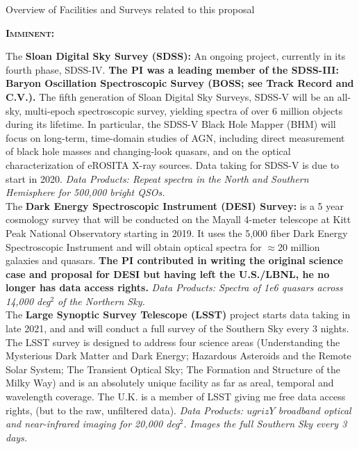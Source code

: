 
\begin{framed}
 \begin{tcolorbox}
   \begin{center} 
     Overview of Facilities and Surveys related to this proposal
   \end{center}
 \end{tcolorbox}
  
\noindent
\textbf{\textsc{Imminent:}}

The {\bf Sloan Digital Sky Survey (SDSS):} An ongoing project,
currently in its fourth phase, SDSS-IV.  {\bf The PI was a leading
member of the SDSS-III: Baryon Oscillation Spectroscopic Survey (BOSS;
see Track Record and C.V.).} The fifth generation of Sloan Digital Sky
Surveys, SDSS-V will be an all-sky, multi-epoch spectroscopic survey,
yielding spectra of over 6 million objects during its lifetime. In
particular, the SDSS-V Black Hole Mapper (BHM) will focus on
long-term, time-domain studies of AGN, including direct measurement of
black hole masses and changing-look quasars, and on the optical
characterization of eROSITA X-ray sources. Data taking for SDSS-V is due to start
in 2020.  {\it Data Products: Repeat spectra
in the North and Southern Hemisphere for 500,000 bright QSOs.} \\

The {\bf Dark Energy Spectroscopic Instrument (DESI) Survey:} is a 5
year cosmology survey that will be conducted on the Mayall 4-meter
telescope at Kitt Peak National Observatory starting in 2019. It uses
the 5,000 fiber Dark Energy Spectroscopic Instrument and will obtain
optical spectra for $\approx$20 million galaxies and quasars.  {\bf
The PI contributed in writing the original science case and proposal
for DESI \citep{Schlegel2011} but having left the U.S./LBNL, he no
longer has data access rights.}  {\it Data Products: Spectra of 1e6
quasars across 14,000 deg$^{2}$ of the Northern Sky.} \\

The {\bf Large Synoptic Survey Telescope (LSST)} project starts data
taking in late 2021, and and will conduct a full survey of the
Southern Sky every 3 nights. The LSST survey is designed to address
four science areas (Understanding the Mysterious Dark Matter and Dark
Energy; Hazardous Asteroids and the Remote Solar System; The Transient
Optical Sky; The Formation and Structure of the Milky Way) and is an
absolutely unique facility as far as areal, temporal and wavelength
coverage. The U.K.  is a member of LSST giving me free data access
rights, (but to the raw, unfiltered data).  {\it Data Products:
$ugrizY$ broadband optical and near-infrared imaging for 20,000
deg$^2$.  Images the full Southern Sky every 3 days.} \\


\end{framed}
